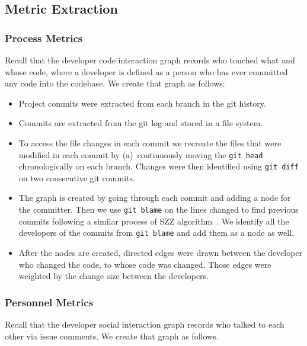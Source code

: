 \documentclass[smallextended]{svjour3}
\newcommand{\bi}{\begin{itemize}}
\newcommand{\ei}{\end{itemize}}
\begin{document}
\subsection{Metric Extraction}
\label{sec:Experimental Setup}

\subsubsection{Process Metrics}
\label{sec:process metrics}
Recall that the  developer code interaction graph records who touched what and whose code, where a developer is defined as a person who has ever committed any code into the codebase. We create that graph as follows:
\bi
\item
Project   commits  were extracted from each branch in the git history. 
\item
Commits are extracted from the git log and stored in a file system.
\item
To access the file changes in each commit we recreate the files that were modified in each commit by (a)~continuously moving the {\tt git head} chronologically on each branch. Changes were then   identified  using {\tt git diff} on two consecutive git commits.
\item
The graph is created by going through each commit and adding a node for the committer. Then we use {\tt git blame} on the lines changed to find previous commits following a similar process of SZZ algorithm~\cite{williams2008szz}. We identify all the developers of the commits from {\tt git blame} and add them as a node as well.
\item
After the nodes are created, directed edges were drawn between the developer who changed the code, to whose code was changed. Those  edges were weighted by the change size between the developers. 
\ei




\subsubsection{Personnel Metrics}
\label{sec:Personnel Metrics}

Recall that the  developer social interaction graph records who talked to each other via issue comments. We create that graph as follows.
\end{document}
